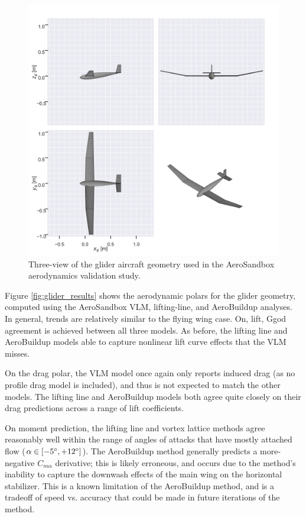 \begin{figure}[!htb]
    \centering
    \includegraphics[width=5in]{../figures/aero_validation/glider_geometry.png}
    \caption{Three-view of the glider aircraft geometry used in the AeroSandbox aerodynamics validation study.}
    \label{fig:glider_geometry}
\end{figure}

Figure \ref{fig:glider_results} shows the aerodynamic polars for the glider geometry, computed using the AeroSandbox VLM, lifting-line, and AeroBuildup analyses. In general, trends are relatively similar to the flying wing case. On, lift, Ggod agreement is achieved between all three models. As before, the lifting line and AeroBuildup models able to capture nonlinear lift curve effects that the VLM misses.

On the drag polar, the VLM model once again only reports induced drag (as no profile drag model is included), and thus is not expected to match the other models. The lifting line and AeroBuildup models both agree quite closely on their drag predictions across a range of lift coefficients.

On moment prediction, the lifting line and vortex lattice methods agree reasonably well within the range of angles of attacks that have mostly attached flow ($\alpha \in [-5\degree, +12\degree]$). The AeroBuildup method generally predicts a more-negative $C_{m\alpha}$ derivative; this is likely erroneous, and occurs due to the method's inability to capture the downwash effects of the main wing on the horizontal stabilizer. This is a known limitation of the AeroBuildup method, and is a tradeoff of speed vs. accuracy that could be made in future iterations of the method.

